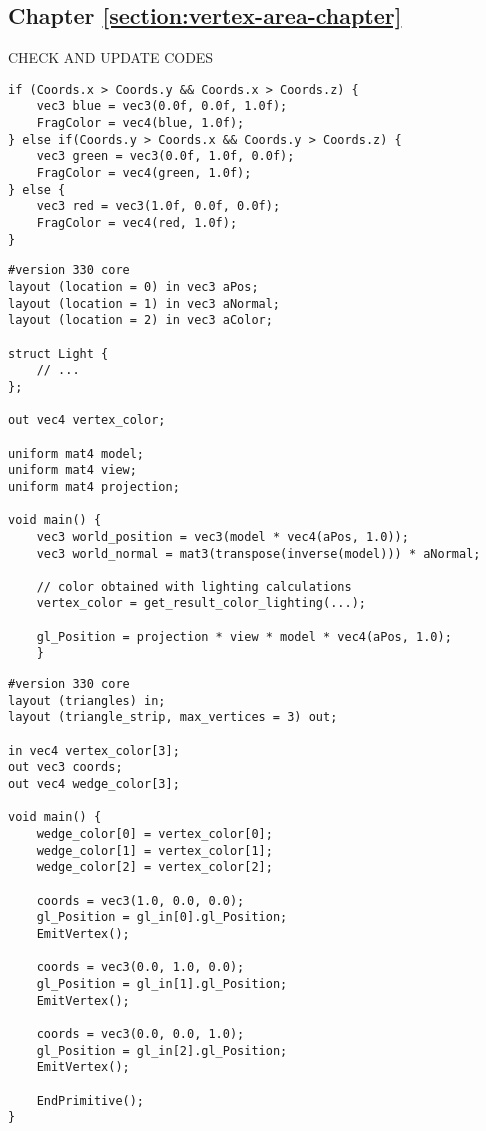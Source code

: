 \subsection{Chapter \ref{section:vertex-area-chapter}}
CHECK AND UPDATE CODES


\begin{lstlisting}[caption={Max diagram - Vertex based area (Section: \ref{section:max-diagram})\label{appendix:max-diagram}}]
if (Coords.x > Coords.y && Coords.x > Coords.z) {
    vec3 blue = vec3(0.0f, 0.0f, 1.0f);
    FragColor = vec4(blue, 1.0f);
} else if(Coords.y > Coords.x && Coords.y > Coords.z) {
    vec3 green = vec3(0.0f, 1.0f, 0.0f);
    FragColor = vec4(green, 1.0f);
} else {
    vec3 red = vec3(1.0f, 0.0f, 0.0f);
    FragColor = vec4(red, 1.0f);
}
\end{lstlisting}

\vspace{10pt}

\begin{lstlisting}[caption={Vertex Shader for flat shading extension using lighting (Section: \ref{section:extend-flat-shading-lighting})\label{appendix:vs-flat-shading-lighting}}]
#version 330 core
layout (location = 0) in vec3 aPos;
layout (location = 1) in vec3 aNormal;
layout (location = 2) in vec3 aColor;

struct Light {
    // ...
};

out vec4 vertex_color;

uniform mat4 model;
uniform mat4 view;
uniform mat4 projection;

void main() {
    vec3 world_position = vec3(model * vec4(aPos, 1.0));
    vec3 world_normal = mat3(transpose(inverse(model))) * aNormal;

    // color obtained with lighting calculations
    vertex_color = get_result_color_lighting(...);

    gl_Position = projection * view * model * vec4(aPos, 1.0);
    }
\end{lstlisting}

\vspace{10pt}

\begin{lstlisting}[caption={Geometry Shader for flat shading extension (Section: \ref{section:extend-flat-shading-lighting})\label{appendix:gs-flat-shading-lighting}}]
#version 330 core
layout (triangles) in;
layout (triangle_strip, max_vertices = 3) out;

in vec4 vertex_color[3];
out vec3 coords;
out vec4 wedge_color[3];

void main() {
    wedge_color[0] = vertex_color[0];
    wedge_color[1] = vertex_color[1];
    wedge_color[2] = vertex_color[2];

    coords = vec3(1.0, 0.0, 0.0);
    gl_Position = gl_in[0].gl_Position;
    EmitVertex();

    coords = vec3(0.0, 1.0, 0.0);
    gl_Position = gl_in[1].gl_Position;
    EmitVertex();

    coords = vec3(0.0, 0.0, 1.0);
    gl_Position = gl_in[2].gl_Position;
    EmitVertex();

    EndPrimitive();
}
\end{lstlisting}


